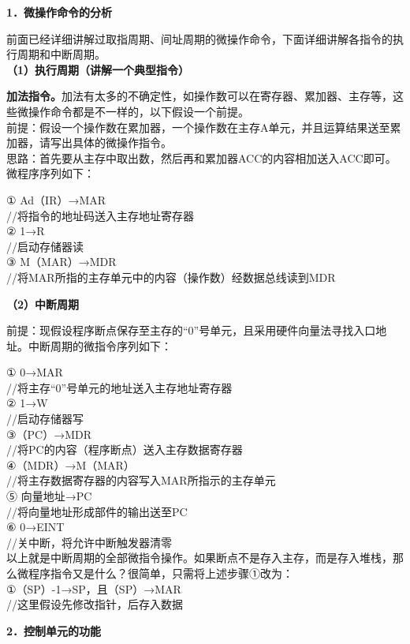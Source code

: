 {\textbf{1．微操作命令的分析}}

前面已经详细讲解过取指周期、间址周期的微操作命令，下面详细讲解各指令的执行周期和中断周期。\\

\textbf{（1）执行周期（讲解一个典型指令）}

\textbf{加法指令。}加法有太多的不确定性，如操作数可以在寄存器、累加器、主存等，这些微操作命令都是不一样的，以下假设一个前提。\\
{前提：}假设一个操作数在累加器，一个操作数在主存A单元，并且运算结果送至累加器，请写出具体的微操作指令。\\

{思路：}首先要从主存中取出数，然后再和累加器ACC的内容相加送入ACC即可。微程序序列如下：

① Ad（IR）→MAR ~ ~~\\
//将指令的地址码送入主存地址寄存器\\
② 1→R ~ ~ ~ ~ ~ ~\\
//启动存储器读\\
③ M（MAR）→MDR ~~\\
//将MAR所指的主存单元中的内容（操作数）经数据总线读到MDR

\textbf{（2）中断周期}

{前提：}现假设程序断点保存至主存的``0''号单元，且采用硬件向量法寻找入口地址。中断周期的微指令序列如下：

① 0→MAR ~~\\
//将主存``0''号单元的地址送入主存地址寄存器\\
② 1→W ~ ~~\\
//启动存储器写\\
③（PC）→MDR ~~\\
//将PC的内容（程序断点）送入主存数据寄存器\\
④（MDR）→M（MAR） ~\\
//将主存数据寄存器的内容写入MAR所指示的主存单元\\
⑤ 向量地址→PC ~ ~\\
//将向量地址形成部件的输出送至PC\\
⑥ 0→EINT ~ ~~\\
//关中断，将允许中断触发器清零\\
以上就是中断周期的全部微指令操作。如果断点不是存入主存，而是存入堆栈，那么微程序指令又是什么？很简单，只需将上述步骤①改为：\\
①（SP）-1→SP，且（SP）→MAR ~\\
//这里假设先修改指针，后存入数据

{\textbf{2．控制单元的功能}}

